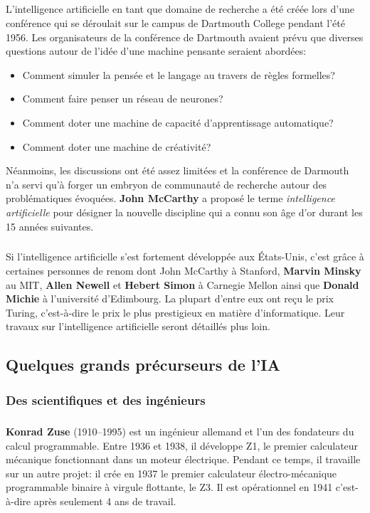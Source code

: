 \subparagraph{}
L’intelligence artificielle en tant que domaine de recherche a été créée lors d’une conférence qui se déroulait sur le campus de Dartmouth College pendant l'été 1956. Les organisateurs de la conférence de Dartmouth avaient prévu que diverses questions autour de l'idée d'une machine pensante seraient abordées:
\begin{itemize}
\item Comment simuler la pensée et le langage au travers de règles formelles?
\item Comment faire penser un réseau de neurones?
\item Comment doter une machine de capacité d'apprentissage automatique?
\item Comment doter une machine de créativité?
\end{itemize}
Néanmoins, les discussions ont été assez limitées et la conférence de Darmouth n'a servi qu'à forger un embryon de communauté de recherche autour des problématiques évoquées.
\textbf{John McCarthy} a proposé le terme \textit{intelligence artificielle} pour désigner la nouvelle discipline qui a connu son âge d'or durant les 15 années suivantes.

\subparagraph{}
Si l'intelligence artificielle s’est fortement développée aux États-Unis, c'est grâce à certaines personnes de renom dont John McCarthy à Stanford, \textbf{Marvin Minsky} au MIT, \textbf{Allen Newell} et \textbf{Hebert Simon} à Carnegie Mellon ainsi que \textbf{Donald Michie} à l’université d’Edimbourg. La plupart d’entre eux ont reçu le prix Turing, c'est-à-dire le prix le plus prestigieux en matière d'informatique. 
Leur travaux sur l'intelligence artificielle seront détaillés plus loin.




\subsection{Quelques grands précurseurs de l'IA}

\subsubsection{Des scientifiques et des ingénieurs}


\subparagraph{}
\textbf{Konrad Zuse} (1910–1995) est un ingénieur allemand et l’un des fondateurs du calcul programmable. Entre  1936 et 1938, il développe Z1, le premier calculateur mécanique fonctionnant dans un moteur électrique. Pendant ce temps, il travaille sur un autre projet: il crée en 1937 le premier calculateur électro-mécanique programmable binaire à virgule flottante, le Z3. Il est opérationnel en 1941 c'est-à-dire après seulement 4 ans de travail.


